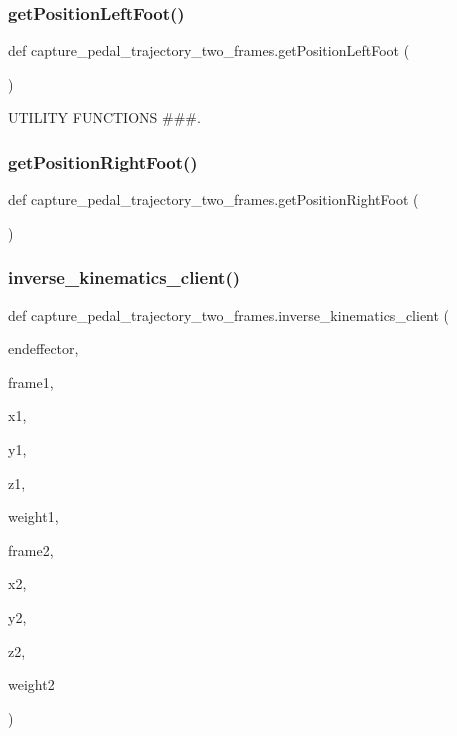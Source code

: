 \subsubsection{\texorpdfstring{getPositionLeftFoot()}{getPositionLeftFoot()}}
{\footnotesize\ttfamily def capture\+\_\+pedal\+\_\+trajectory\+\_\+two\+\_\+frames.\+get\+Position\+Left\+Foot (\begin{DoxyParamCaption}{ }\end{DoxyParamCaption})}



U\+T\+I\+L\+I\+TY F\+U\+N\+C\+T\+I\+O\+NS \#\#\#. 

\mbox{\label{namespacecapture__pedal__trajectory__two__frames_ace71d5b8ce6f0896550deef9afbaf6b7}} 
\subsubsection{\texorpdfstring{getPositionRightFoot()}{getPositionRightFoot()}}
{\footnotesize\ttfamily def capture\+\_\+pedal\+\_\+trajectory\+\_\+two\+\_\+frames.\+get\+Position\+Right\+Foot (\begin{DoxyParamCaption}{ }\end{DoxyParamCaption})}

\mbox{\label{namespacecapture__pedal__trajectory__two__frames_a531f122b71d703de15f006e3a975e618}} 
\subsubsection{\texorpdfstring{inverse\_kinematics\_client()}{inverse\_kinematics\_client()}}
{\footnotesize\ttfamily def capture\+\_\+pedal\+\_\+trajectory\+\_\+two\+\_\+frames.\+inverse\+\_\+kinematics\+\_\+client (\begin{DoxyParamCaption}\item[{}]{endeffector,  }\item[{}]{frame1,  }\item[{}]{x1,  }\item[{}]{y1,  }\item[{}]{z1,  }\item[{}]{weight1,  }\item[{}]{frame2,  }\item[{}]{x2,  }\item[{}]{y2,  }\item[{}]{z2,  }\item[{}]{weight2 }\end{DoxyParamCaption})}

